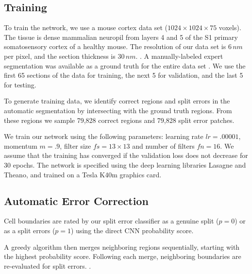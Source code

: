 \subsection{Training}
To train the network, we use a mouse cortex data set ($1024\times1024\times75$ voxels). The tissue is dense mammalian neuropil from layers 4 and 5 of the S1 primary somatosensory cortex of a healthy mouse. The resolution of our data set is $6\, nm$ per pixel, and the section thickness is $30\, nm$. . A manually-labeled expert segmentation was available as a ground truth for the entire data set . We use the first 65 sections of the data for training, the next 5 for validation, and the last 5 for testing.
%

To generate training data, we identify correct regions and split errors in the automatic segmentation by intersecting with the ground truth regions. From these regions we sample 79,828 correct regions and 79,828 split error patches.

We train our network using the following parameters: learning rate $lr=.00001$, momentum $m=.9$, filter size $fs=13\times13$ and number of filters $fn=16$. We assume that the training has converged if the validation loss does not decrease for 30 epochs. The network is specified using the deep learning libraries Lasagne and Theano, and trained on a Tesla K40m graphics card. 



\subsection{Automatic Error Correction}
Cell boundaries are rated by our split error classifier as a genuine split ($p=0$) or as a split errors ($p=1$) using the direct CNN probability score. 

A greedy algorithm then merges neighboring regions sequentially, starting with the highest probability score. Following each merge, neighboring boundaries are re-evaluated for split errors. .

